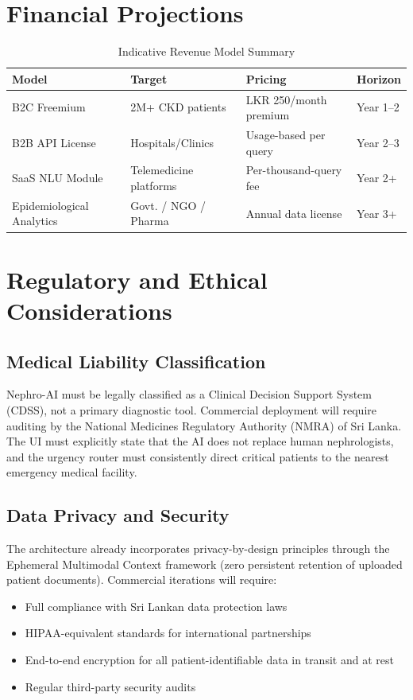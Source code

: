 \documentclass[12pt,a4paper]{report}
\begin{document}
\section{Financial Projections}

\begin{table}[H]
\centering
\caption{Indicative Revenue Model Summary}
\label{tab:revenue}
\renewcommand{\arraystretch}{1.3}
\begin{tabularx}{\textwidth}{@{}lXXl@{}}
\toprule
\textbf{Model} & \textbf{Target} & \textbf{Pricing} & \textbf{Horizon} \\
\midrule
B2C Freemium & 2M+ CKD patients & LKR 250/month premium & Year 1--2 \\
B2B API License & Hospitals/Clinics & Usage-based per query & Year 2--3 \\
SaaS NLU Module & Telemedicine platforms & Per-thousand-query fee & Year 2+ \\
Epidemiological Analytics & Govt. / NGO / Pharma & Annual data license & Year 3+ \\
\bottomrule
\end{tabularx}
\end{table}

\section{Regulatory and Ethical Considerations}

\subsection{Medical Liability Classification}

Nephro-AI must be legally classified as a Clinical Decision Support System (CDSS), not a primary diagnostic tool. Commercial deployment will require auditing by the National Medicines Regulatory Authority (NMRA) of Sri Lanka. The UI must explicitly state that the AI does not replace human nephrologists, and the urgency router must consistently direct critical patients to the nearest emergency medical facility.

\subsection{Data Privacy and Security}

The architecture already incorporates privacy-by-design principles through the Ephemeral Multimodal Context framework (zero persistent retention of uploaded patient documents). Commercial iterations will require:
\begin{itemize}
  \item Full compliance with Sri Lankan data protection laws
  \item HIPAA-equivalent standards for international partnerships
  \item End-to-end encryption for all patient-identifiable data in transit and at rest
  \item Regular third-party security audits
\end{itemize}
\end{document}
